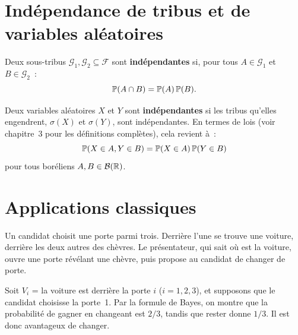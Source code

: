 \section{Ind\'ependance de tribus et de variables al\'eatoires}

\begin{definition}
Deux sous-tribus $\mathcal{G}_1, \mathcal{G}_2 \subseteq \mathcal{F}$ sont
\textbf{ind\'ependantes} si, pour tous $A \in \mathcal{G}_1$ et
$B \in \mathcal{G}_2$~:
\[
    \mathbb{P}(A \cap B) = \mathbb{P}(A)\, \mathbb{P}(B).
\]
\end{definition}

\begin{definition}
Deux variables al\'eatoires $X$ et $Y$ sont \textbf{ind\'ependantes} si les
tribus qu'elles engendrent, $\sigma(X)$ et $\sigma(Y)$, sont ind\'ependantes.
En termes de lois (voir chapitre~3 pour les d\'efinitions compl\`etes),
cela revient \`a~:
\[
    \mathbb{P}(X \in A, Y \in B) = \mathbb{P}(X \in A)\, \mathbb{P}(Y \in B)
\]
pour tous bor\'eliens $A, B \in \mathcal{B}(\mathbb{R})$.
\end{definition}

\section{Applications classiques}

\begin{exemple}
Un candidat choisit une porte parmi trois. Derri\`ere l'une se trouve une voiture,
derri\`ere les deux autres des ch\`evres. Le pr\'esentateur, qui sait o\`u est la
voiture, ouvre une porte r\'ev\'elant une ch\`evre, puis propose au candidat de
changer de porte.

Soit $V_i$ = \og la voiture est derri\`ere la porte $i$ \fg ($i=1,2,3$), et
supposons que le candidat choisisse la porte~1. Par la formule de Bayes, on
montre que la probabilit\'e de gagner en changeant est $2/3$, tandis que
rester donne $1/3$. Il est donc avantageux de changer.
\end{exemple}

